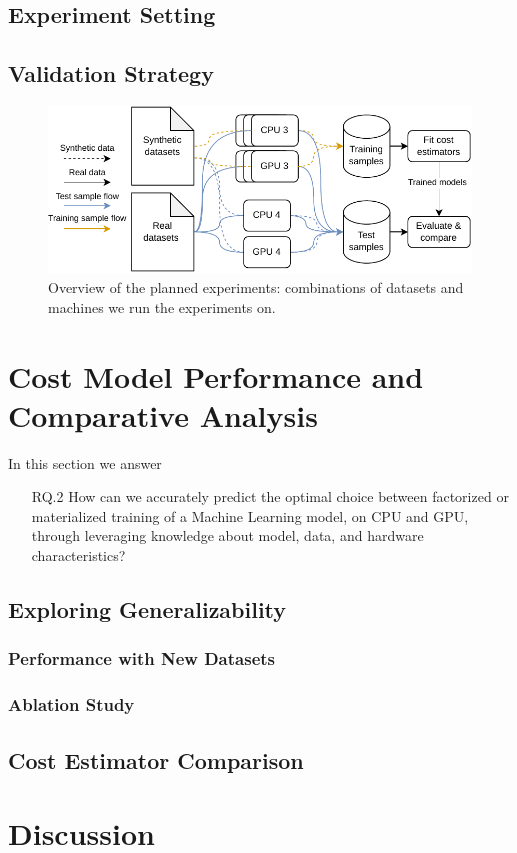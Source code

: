 \subsection{Experiment Setting}

\subsection{Validation Strategy}
\label{subsec:6-validation-strategy}

\begin{figure}[ht]
  \centering
  \includegraphics[width=0.8\linewidth]{chapters/06_evaluation/figures/experiment-pipeline.pdf}
  \caption{ Overview of the planned experiments: combinations of datasets and machines we run the experiments
    on. }
  \label{fig:enter-label}
\end{figure}



\section{Cost Model Performance and Comparative Analysis}
\label{sec:eval-model-evaluation}

In this section we answer
\begin{itemize}
  \item[RQ.2] How can we accurately predict the optimal choice between factorized or materialized training of a Machine Learning model, on CPU and GPU, through leveraging knowledge about model, data, and hardware characteristics?
\end{itemize}

\subsection{Exploring Generalizability}
\subsubsection{Performance with New Datasets}

\subsubsection{Ablation Study}


\subsection{Cost Estimator Comparison}


\section{Discussion}
\label{sec:eval-discussion}

